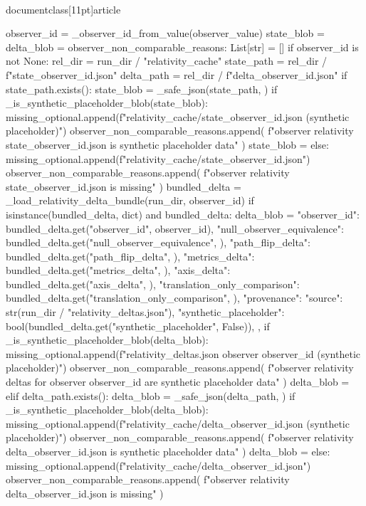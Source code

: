 \\documentclass[11pt]{article}
\begin{document}
\begin{CodeBlock}
{    observer_id = _observer_id_from_value(observer_value)
    state_blob = {}
    delta_blob = {}
    observer_non_comparable_reasons: List[str] = []
    if observer_id is not None:
        rel_dir = run_dir / "relativity_cache"
        state_path = rel_dir / f"state_{observer_id}.json"
        delta_path = rel_dir / f"delta_{observer_id}.json"
        if state_path.exists():
            state_blob = _safe_json(state_path, {})
            if _is_synthetic_placeholder_blob(state_blob):
                missing_optional.append(f"relativity_cache/state_{observer_id}.json (synthetic placeholder)")
                observer_non_comparable_reasons.append(
                    f"observer relativity state_{observer_id}.json is synthetic placeholder data"
                )
                state_blob = {}
        else:
            missing_optional.append(f"relativity_cache/state_{observer_id}.json")
            observer_non_comparable_reasons.append(
                f"observer relativity state_{observer_id}.json is missing"
            )
        bundled_delta = _load_relativity_delta_bundle(run_dir, observer_id)
        if isinstance(bundled_delta, dict) and bundled_delta:
            delta_blob = {
                "observer_id": bundled_delta.get("observer_id", observer_id),
                "null_observer_equivalence": bundled_delta.get("null_observer_equivalence", {}),
                "path_flip_delta": bundled_delta.get("path_flip_delta", {}),
                "metrics_delta": bundled_delta.get("metrics_delta", {}),
                "axis_delta": bundled_delta.get("axis_delta", {}),
                "translation_only_comparison": bundled_delta.get("translation_only_comparison", {}),
                "provenance": {
                    "source": str(run_dir / "relativity_deltas.json"),
                    "synthetic_placeholder": bool(bundled_delta.get("synthetic_placeholder", False)),
                },
            }
            if _is_synthetic_placeholder_blob(delta_blob):
                missing_optional.append(f"relativity_deltas.json observer {observer_id} (synthetic placeholder)")
                observer_non_comparable_reasons.append(
                    f"observer relativity deltas for observer {observer_id} are synthetic placeholder data"
                )
                delta_blob = {}
        elif delta_path.exists():
            delta_blob = _safe_json(delta_path, {})
            if _is_synthetic_placeholder_blob(delta_blob):
                missing_optional.append(f"relativity_cache/delta_{observer_id}.json (synthetic placeholder)")
                observer_non_comparable_reasons.append(
                    f"observer relativity delta_{observer_id}.json is synthetic placeholder data"
                )
                delta_blob = {}
        else:
            missing_optional.append(f"relativity_cache/delta_{observer_id}.json")
            observer_non_comparable_reasons.append(
                f"observer relativity delta_{observer_id}.json is missing"
            )

}
\end{CodeBlock}
\end{document}
